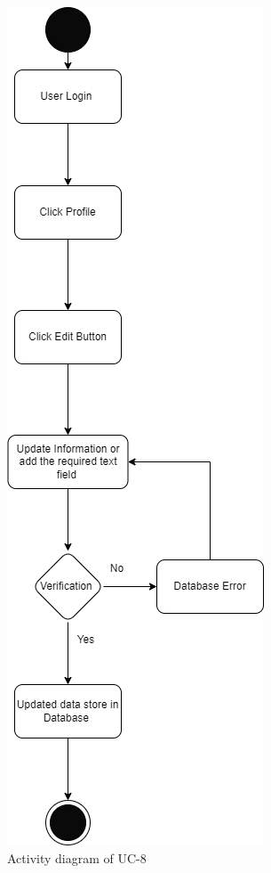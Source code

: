 \begin{figure}[H]
    \centering
    \includegraphics[scale=0.5]{./diagrams/Activity Diagram/ad-08.png}
    \caption{Activity diagram of UC-8}
    \label{fig:act-08}

\end{figure}



